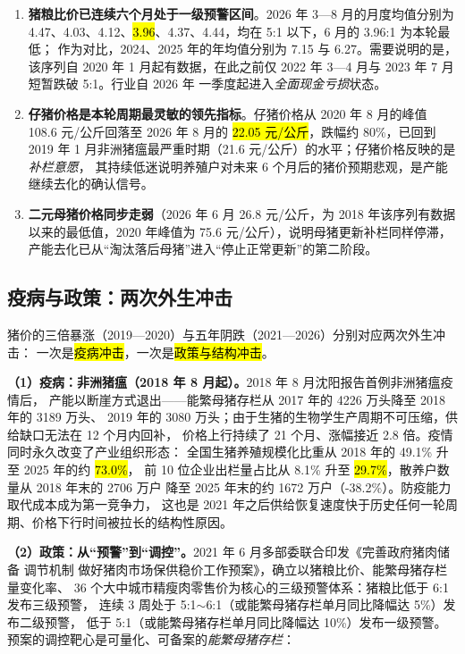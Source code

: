 \begin{enumerate}
  \item \textbf{猪粮比价已连续六个月处于一级预警区间}。2026 年 3---8 月的月度均值分别为
  4.47、4.03、4.12、\hl{3.96}、4.37、4.44，均在 5:1 以下，6 月的 3.96:1 为本轮最低；
  作为对比，2024、2025 年的年均值分别为 7.15 与 6.27。需要说明的是，该序列自 2020 年
  1 月起有数据，在此之前仅 2022 年 3---4 月与 2023 年 7 月短暂跌破 5:1。行业自 2026 年
  一季度起进入\emph{全面现金亏损}状态。
  \item \textbf{仔猪价格是本轮周期最灵敏的领先指标}。仔猪价格从 2020 年 8 月的峰值
  108.6 元/公斤回落至 2026 年 8 月的 \hl{22.05 元/公斤}，跌幅约 80\%，已回到 2019 年
  1 月非洲猪瘟最严重时期（21.6 元/公斤）的水平；仔猪价格反映的是\emph{补栏意愿}，
  其持续低迷说明养殖户对未来 6 个月后的猪价预期悲观，是产能继续去化的确认信号。
  \item \textbf{二元母猪价格同步走弱}（2026 年 6 月 26.8 元/公斤，为 2018 年该序列有数据
  以来的最低值，2020 年峰值为 75.6 元/公斤），说明母猪更新补栏同样停滞，
  产能去化已从“淘汰落后母猪”进入“停止正常更新”的第二阶段。
\end{enumerate}

\subsection{疫病与政策：两次外生冲击}
\label{sec:hog-shock}

猪价的三倍暴涨（2019---2020）与五年阴跌（2021---2026）分别对应两次外生冲击：
一次是\hl{疫病冲击}，一次是\hl{政策与结构冲击}。

\textbf{（1）疫病：非洲猪瘟（2018 年 8 月起）。}2018 年 8 月沈阳报告首例非洲猪瘟疫情后，
产能以断崖方式退出——能繁母猪存栏从 2017 年的 4226 万头降至 2018 年的 3189 万头、
2019 年的 3080 万头；由于生猪的生物学生产周期不可压缩，供给缺口无法在 12 个月内回补，
价格上行持续了 21 个月、涨幅接近 2.8 倍。疫情同时永久改变了产业组织形态：
全国生猪养殖规模化比重从 2018 年的 49.1\% 升至 2025 年的约 \hl{73.0\%}，
前 10 位企业出栏量占比从 8.1\% 升至 \hl{29.7\%}，散养户数量从 2018 年末的 2706 万户
降至 2025 年末的约 1672 万户（-38.2\%）\cite{sun2026hog}。防疫能力取代成本成为第一竞争力，
这也是 2021 年之后供给恢复速度快于历史任何一轮周期、价格下行时间被拉长的结构性原因。

\textbf{（2）政策：从“预警”到“调控”。}2021 年 6 月多部委联合印发《完善政府猪肉储备
调节机制 做好猪肉市场保供稳价工作预案》，确立以猪粮比价、能繁母猪存栏量变化率、
36 个大中城市精瘦肉零售价为核心的三级预警体系：猪粮比低于 6:1 发布三级预警，
连续 3 周处于 5:1$\sim$6:1（或能繁母猪存栏单月同比降幅达 5\%）发布二级预警，
低于 5:1（或能繁母猪存栏单月同比降幅达 10\%）发布一级预警\cite{ndrc2021reserve,nbd2025pigcorn}。
预案的调控靶心是可量化、可备案的\emph{能繁母猪存栏}：

